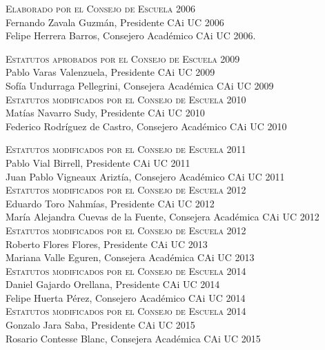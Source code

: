 \documentclass[letterpaper,11pt]{article}
\theoremstyle{plain}
\begin{document}
	\begin{sloppypar}
		\textsc{Elaborado por el Consejo de Escuela 2006}\\
		Fernando Zavala Guzmán, Presidente CAi UC 2006\\
		Felipe Herrera Barros, Consejero Académico CAi UC 2006.

		\textsc{Estatutos aprobados por el Consejo de Escuela 2009}\\
		Pablo Varas Valenzuela, Presidente CAi UC 2009\\
		Sofía Undurraga Pellegrini, Consejera Académica CAi UC 2009\\

		\textsc{Estatutos modificados por el Consejo de Escuela 2010}\\
		Matías Navarro Sudy, Presidente CAi UC 2010\\
		Federico Rodríguez de Castro, Consejero Académico CAi UC 2010

		\textsc{Estatutos modificados por el Consejo de Escuela 2011}\\
		Pablo Vial Birrell, Presidente CAi UC 2011\\
		Juan Pablo Vigneaux Ariztía, Consejero Académico CAi UC 2011\\

		\textsc{Estatutos modificados por el Consejo de Escuela 2012}\\
		Eduardo Toro Nahmías, Presidente CAi UC 2012\\
		María Alejandra Cuevas de la Fuente, Consejera Académica CAi UC 2012\\

		\textsc{Estatutos modificados por el Consejo de Escuela 2012}\\
		Roberto Flores Flores, Presidente CAi UC 2013\\
		Mariana Valle Eguren, Consejera Académica CAi UC 2013\\

		\textsc{Estatutos modificados por el Consejo de Escuela 2014}\\
		Daniel Gajardo Orellana, Presidente CAi UC 2014\\
		Felipe Huerta Pérez, Consejero Académico CAi UC 2014\\

		\textsc{Estatutos modificados por el Consejo de Escuela 2014}\\
		Gonzalo Jara Saba, Presidente CAi UC 2015\\
		Rosario Contesse Blanc, Consejera Académica CAi UC 2015\\


\end{sloppypar}
\end{document}
